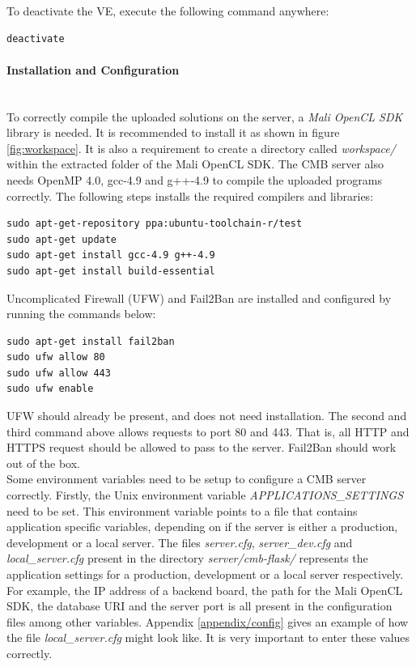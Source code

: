 To deactivate the VE, execute the following command anywhere:
\begin{lstlisting}[language=sh]
deactivate
\end{lstlisting}

\paragraph*{Installation and Configuration} \hfill \\
To correctly compile the uploaded solutions on the server, a \textit{Mali OpenCL SDK} \cite{m:mali} library is needed. It is recommended to install it as shown in figure \ref{fig:workspace}. It is also a requirement to create a directory called \textit{workspace/} within the extracted folder of the Mali OpenCL SDK. The CMB server also needs OpenMP 4.0, gcc-4.9 and g++-4.9 to compile the uploaded programs correctly. The following steps installs the required compilers and libraries:
\begin{lstlisting}
sudo apt-get-repository ppa:ubuntu-toolchain-r/test
sudo apt-get update
sudo apt-get install gcc-4.9 g++-4.9
sudo apt-get install build-essential
\end{lstlisting}

Uncomplicated Firewall (UFW) \cite{m:ufw} and Fail2Ban \cite{m:f2b} are installed and configured by running the commands below:
\begin{lstlisting}
sudo apt-get install fail2ban
sudo ufw allow 80
sudo ufw allow 443
sudo ufw enable
\end{lstlisting}
UFW should already be present, and does not need installation. The second and third command above allows requests to port 80 and 443. That is, all HTTP and HTTPS request should be allowed to pass to the server. Fail2Ban should work out of the box.\\

Some environment variables need to be setup to configure a CMB server correctly. Firstly, the Unix environment variable \textit{APPLICATIONS\_SETTINGS} need to be set. This environment variable points to a file that contains application specific variables, depending on if the server is either a production, development or a local server. The files \textit{server.cfg}, \textit{server\_dev.cfg} and \textit{local\_server.cfg} present in the directory \textit{server/cmb-flask/} represents the application settings for a production, development or a local server respectively. For example, the IP address of a backend board, the path for the Mali OpenCL SDK, the database URI and the server port is all present in the configuration files among other variables. Appendix \ref{appendix/config} gives an example of how the file \textit{local\_server.cfg} might look like. It is very important to enter these values correctly. \\

